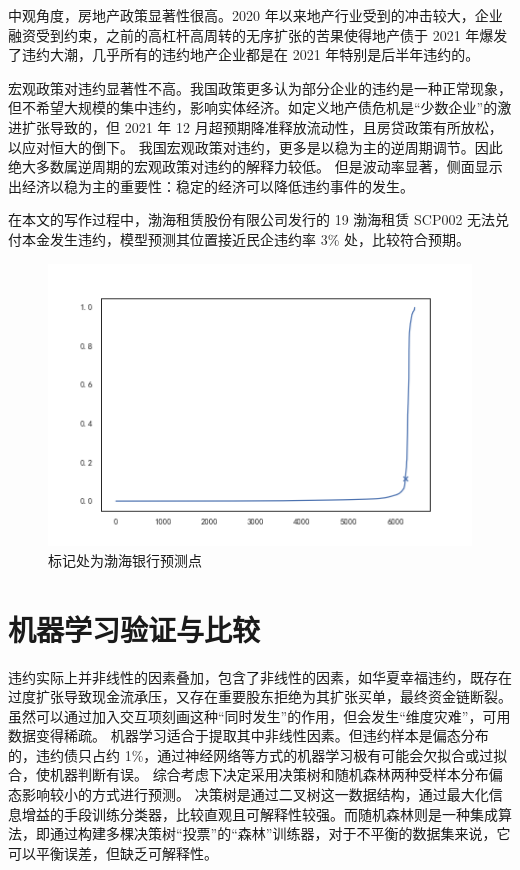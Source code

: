 中观角度，房地产政策显著性很高。2020 年以来地产行业受到的冲击较大，企业融资受到约束，之前的高杠杆高周转的无序扩张的苦果使得地产债于 2021 年爆发了违约大潮，几乎所有的违约地产企业都是在 2021 年特别是后半年违约的。

宏观政策对违约显著性不高。我国政策更多认为部分企业的违约是一种正常现象，但不希望大规模的集中违约，影响实体经济。如定义地产债危机是“少数企业”的激进扩张导致的，但 2021 年 12 月超预期降准释放流动性，且房贷政策有所放松，以应对恒大的倒下。
我国宏观政策对违约，更多是以稳为主的逆周期调节。因此绝大多数属逆周期的宏观政策对违约的解释力较低。
但是波动率显著，侧面显示出经济以稳为主的重要性：稳定的经济可以降低违约事件的发生。

在本文的写作过程中，渤海租赁股份有限公司发行的 19 渤海租赁 SCP002 无法兑付本金发生违约，模型预测其位置接近民企违约率 3\% 处，比较符合预期。
\begin{figure}[h]
	\centering
	\includegraphics[width=0.9\linewidth]{./data/渤海银行.png}
	\caption{标记处为渤海银行预测点}
	\label{fig:bhyh}
\end{figure}

\section{机器学习验证与比较}
违约实际上并非线性的因素叠加，包含了非线性的因素，如华夏幸福违约，既存在过度扩张导致现金流承压，又存在重要股东拒绝为其扩张买单，最终资金链断裂。虽然可以通过加入交互项刻画这种“同时发生”的作用，但会发生“维度灾难”，可用数据变得稀疏。
机器学习适合于提取其中非线性因素。但违约样本是偏态分布的，违约债只占约 1\%，通过神经网络等方式的机器学习极有可能会欠拟合或过拟合，使机器判断有误。
综合考虑下决定采用决策树和随机森林两种受样本分布偏态影响较小的方式进行预测。
决策树是通过二叉树这一数据结构，通过最大化信息增益的手段训练分类器，比较直观且可解释性较强。而随机森林则是一种集成算法，即通过构建多棵决策树“投票”的“森林”训练器，对于不平衡的数据集来说，它可以平衡误差，但缺乏可解释性。


